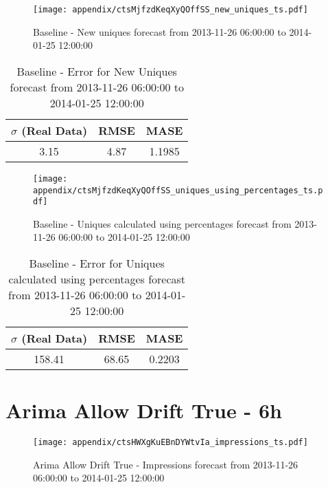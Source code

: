 \begin{figure}[H] \begin{center} \leavevmode
\texttt{[image: appendix/ctsMjfzdKeqXyQOffSS\_new\_uniques\_ts.pdf]} \caption{
Baseline - New uniques forecast from 2013-11-26 06:00:00 to 2014-01-25 12:00:00} \label{fig:appendix/ctsMjfzdKeqXyQOffSS_new_uniques_ts.pdf} \end{center}
\end{figure}

\begin{table}[H]
\centering
\footnotesize
\begin{tabular}{ccc}
$\sigma$ (Real Data) & RMSE & MASE   \\ \hline
3.15 & 4.87 & 1.1985 \\
\end{tabular}

\vspace{0.5cm}

\caption{
Baseline - Error for New Uniques forecast from 2013-11-26 06:00:00 to 2014-01-25 12:00:00}
\end{table}

\begin{figure}[H] \begin{center} \leavevmode
\texttt{[image: appendix/ctsMjfzdKeqXyQOffSS\_uniques\_using\_percentages\_ts.pdf]} \caption{
Baseline - Uniques calculated using percentages forecast from 2013-11-26 06:00:00 to 2014-01-25 12:00:00} \label{fig:appendix/ctsMjfzdKeqXyQOffSS_uniques_using_percentages_ts.pdf} \end{center}
\end{figure}

\begin{table}[H]
\centering
\footnotesize
\begin{tabular}{ccc}
$\sigma$ (Real Data) & RMSE & MASE   \\ \hline
158.41 & 68.65 & 0.2203 \\
\end{tabular}

\vspace{0.5cm}

\caption{
Baseline - Error for Uniques calculated using percentages forecast from 2013-11-26 06:00:00 to 2014-01-25 12:00:00}
\end{table}

\section{Arima Allow Drift True - 6h}
\begin{figure}[H] \begin{center} \leavevmode
\texttt{[image: appendix/ctsHWXgKuEBnDYWtvIa\_impressions\_ts.pdf]} \caption{
Arima Allow Drift True - Impressions forecast from 2013-11-26 06:00:00 to 2014-01-25 12:00:00} \label{fig:appendix/ctsHWXgKuEBnDYWtvIa_impressions_ts.pdf} \end{center}
\end{figure}

